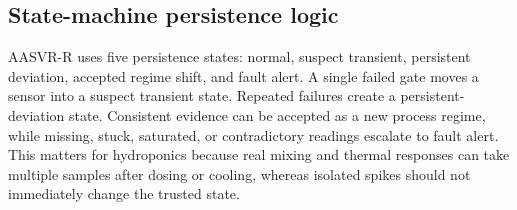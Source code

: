 \documentclass[preprint,12pt,doubleblind]{elsarticle}
\begin{document}
\begin{table}[!htbp]
\centering
\caption{Manuscript AASVR-R configuration and exhaustive sensitivity ranges. The exhaustive profile is implemented as a shardable reproducibility protocol; the manuscript tables use the held-out benchmark unless explicitly marked as exhaustive sensitivity.}
\label{tab:aasvr_config}
\footnotesize
{}
\end{table}

\subsection{State-machine persistence logic}
AASVR-R uses five persistence states: normal, suspect transient, persistent deviation, accepted regime shift, and fault alert. A single failed gate moves a sensor into a suspect transient state. Repeated failures create a persistent-deviation state. Consistent evidence can be accepted as a new process regime, while missing, stuck, saturated, or contradictory readings escalate to fault alert. This matters for hydroponics because real mixing and thermal responses can take multiple samples after dosing or cooling, whereas isolated spikes should not immediately change the trusted state.
\end{document}
